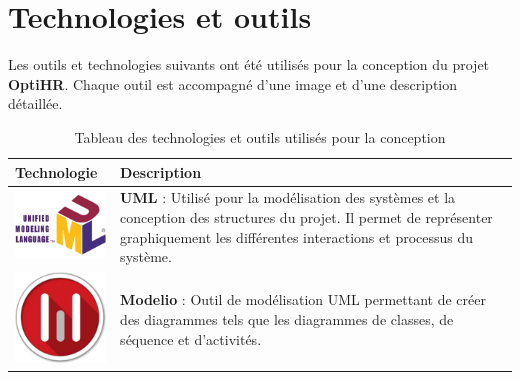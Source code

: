 \section{Technologies et outils}
Les outils et technologies suivants ont été utilisés pour la conception du
projet \textbf{OptiHR}. Chaque outil est accompagné d'une image et d'une
description détaillée.

\vspace{1cm} %

\renewcommand{\arraystretch}{1.5} %

\begin{center}
    \begin{table}[H]  %
       

        \begin{tabular}{|m{4cm}|m{10cm}|}
            \hline
            \textbf{Technologie}                                 & \textbf{Description}                                                                                                                                                                             \\
            \hline

            \includegraphics[width=3cm]{images/logo/uml.png}     & \textbf{UML} : Utilisé pour la modélisation des systèmes et la conception des structures du projet. Il permet de représenter graphiquement les différentes interactions et processus du système. \\
            \hline

            \includegraphics[width=3cm]{images/logo/modelio.png} & \textbf{Modelio} : Outil de modélisation UML permettant de créer des diagrammes tels que les diagrammes de classes, de séquence et d'activités.                                                  \\
            \hline

        \end{tabular}
        \caption{Tableau des technologies et outils utilisés pour la conception} %
        \label{tab:technos_conception} %
    \end{table}
\end{center}

